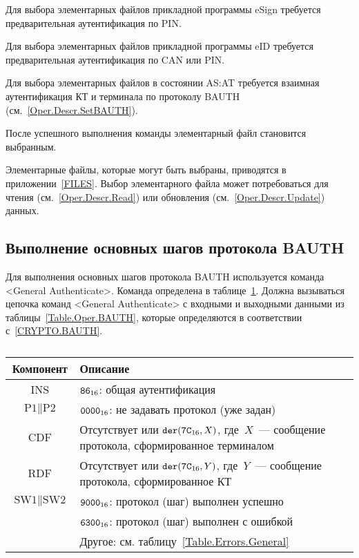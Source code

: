 Для выбора элементарных файлов прикладной программы eSign 
требуется предварительная аутентификация по PIN.

Для выбора элементарных файлов прикладной программы eID 
требуется предварительная аутентификация по CAN или PIN.

Для выбора элементарных файлов в состоянии AS:AT
требуется взаимная аутентификация КТ и терминала
по протоколу BAUTH (см.~\ref{Oper.Descr.SetBAUTH}).

После успешного выполнения команды элементарный файл становится выбранным.

Элементарные файлы, которые могут быть выбраны, 
приводятся в приложении~\ref{FILES}.  
Выбор элементарного файла может потребоваться для
чтения (см.~\ref{Oper.Descr.Read}) или 
обновления (см.~\ref{Oper.Descr.Update}) данных.

\subsection{Выполнение основных шагов протокола BAUTH}
\label{Oper.Descr.GABAUTH} 

Для выполнения основных шагов протокола BAUTH используется 
команда <General Authenticate>. 
Команда определена в таблице~\ref{Table.Oper.GABAUTHCmd}.
Должна вызываться цепочка команд <General Authenticate> 
с входными и выходными данными из таблицы~\ref{Table.Oper.BAUTH}, 
которые определяются в соответствии с~\ref{CRYPTO.BAUTH}. 

\begin{table}[H]
\caption{}\label{Table.Oper.GABAUTHCmd}
\begin{tabular}{|c|p{14cm}|}
\hline
Компонент & 	Описание \\
\hline
\hline
INS & $\texttt{86}_{16}$: общая аутентификация\\
\hline
$\text{P1} \parallel \text{P2}$ & $\texttt{0000}_{16}$: не задавать протокол (уже задан)\\ 
\hline
CDF & Отсутствует или $\texttt{der}(\texttt{7C}_{16}, X)$, 
где~$X$~--- сообщение протокола, сформированное терминалом\\
\hline 
\hline
RDF & Отсутствует или $\texttt{der}(\texttt{7C}_{16}, Y)$, где~$Y$~--- 
сообщение протокола, сформированное КТ\\
\hline
$\text{SW1} \parallel \text{SW2}$ 
  & $\texttt{9000}_{16}$: протокол (шаг) выполнен успешно \\
\cline{2-2}
  & $\texttt{6300}_{16}$: протокол (шаг) выполнен с ошибкой \\
\cline{2-2}
  & Другое: см. таблицу~\ref{Table.Errors.General} \\
\hline
\end{tabular}
\end{table}

